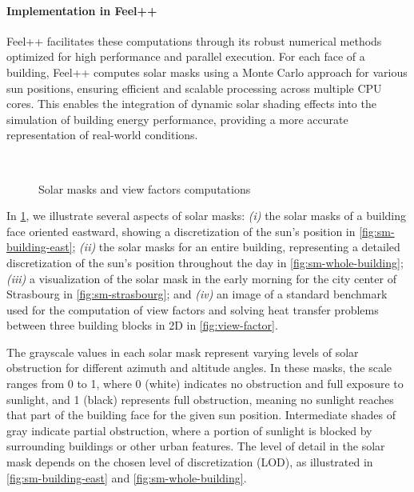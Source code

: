 \documentclass[runningheads]{llncs}
\begin{document}
\paragraph{Implementation in Feel++}
Feel++ facilitates these computations through its robust numerical methods optimized for high performance and parallel execution. For each face of a building, Feel++ computes solar masks using a Monte Carlo approach for various sun positions, ensuring efficient and scalable processing across multiple CPU cores. This enables the integration of dynamic solar shading effects into the simulation of building energy performance, providing a more accurate representation of real-world conditions.

\begin{figure}[ht]
\centering
{}
\hfill
{}\\
\hfill
{}
\caption{Solar masks and view factors computations}
\label{fig:solar-masks-vf}
\end{figure}


In \cref{fig:solar-masks-vf}, we illustrate several aspects of solar masks: \textit{(i)} the solar masks of a building face oriented eastward, showing a discretization of the sun's position in \cref{fig:sm-building-east}; \textit{(ii)} the solar masks for an entire building, representing a detailed discretization of the sun's position throughout the day in \cref{fig:sm-whole-building}; \textit{(iii)} a visualization of the solar mask in the early morning for the city center of Strasbourg in \cref{fig:sm-strasbourg}; and \textit{(iv)} an image of a standard benchmark~\cite{van_eck_surface_2016} used for the computation of view factors and solving heat transfer problems between three building blocks in 2D in \cref{fig:view-factor}.

The grayscale values in each solar mask represent varying levels of solar obstruction for different azimuth and altitude angles.
In these masks, the scale ranges from 0 to 1, where 0 (white) indicates no obstruction and full exposure to sunlight, and 1 (black) represents full obstruction, meaning no sunlight reaches that part of the building face for the given sun position. 
Intermediate shades of gray indicate partial obstruction, where a portion of sunlight is blocked by surrounding buildings or other urban features.
The level of detail in the solar mask depends on the chosen level of discretization (LOD), as illustrated in \cref{fig:sm-building-east} and \cref{fig:sm-whole-building}.
\end{document}
